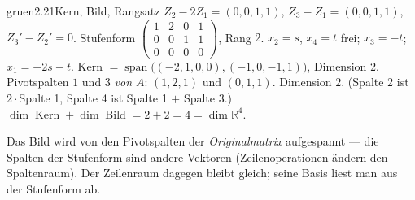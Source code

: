 \begin{loesungkarte}{gruen}{2.21}{Kern, Bild, Rangsatz}
$Z_2 - 2Z_1 = (0, 0, 1, 1)$, $Z_3 - Z_1 = (0, 0, 1, 1)$, $Z_3' - Z_2' = 0$. Stufenform $\begin{pmatrix}1 & 2 & 0 & 1\\ 0 & 0 & 1 & 1\\ 0 & 0 & 0 & 0\end{pmatrix}$, Rang $2$.
$x_2 = s$, $x_4 = t$ frei; $x_3 = -t$; $x_1 = -2s - t$. Kern $= \operatorname{span}\bigl((-2, 1, 0, 0), (-1, 0, -1, 1)\bigr)$, Dimension $2$.
Pivotspalten $1$ und $3$ \emph{von $A$}: $(1, 2, 1)$ und $(0, 1, 1)$. Dimension $2$. (Spalte 2 ist $2\cdot$Spalte 1, Spalte 4 ist Spalte 1 $+$ Spalte 3.)
$\dim\operatorname{Kern} + \dim\operatorname{Bild} = 2 + 2 = 4 = \dim\mathbb R^{4}$. \checkmark
{}
\begin{mitnehmen}\kastentext
Das Bild wird von den Pivotspalten der \emph{Originalmatrix} aufgespannt --- die Spalten der Stufenform sind andere Vektoren (Zeilenoperationen ändern den Spaltenraum). Der Zeilenraum dagegen bleibt gleich; seine Basis liest man aus der Stufenform ab.
\end{mitnehmen}
\end{loesungkarte}

